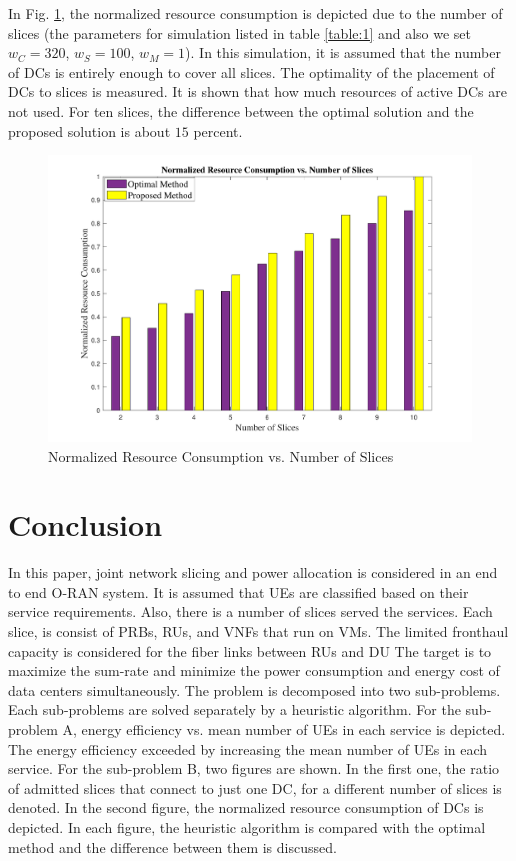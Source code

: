 \documentclass[conference]{IEEEtran}
\begin{document}
In Fig. \ref{fig:f2}, the normalized resource consumption is depicted due to the number of slices (the parameters for simulation listed in table \ref{table:1} and also we set $w_C = 320$, $w_S = 100$, $w_M =1$). In this simulation, it is assumed that the number of DCs is entirely enough to cover all slices. The optimality of the placement of DCs to slices is measured. It is shown that how much resources of active DCs are not used. For ten slices, the difference between the optimal solution and the proposed solution is about $15$ percent.
\begin{figure}%
  \centering
    \includegraphics[width=\linewidth]{fig22_last}
  \caption{Normalized Resource Consumption vs. Number of Slices}
  \label{fig:f2}
\end{figure}
\section{Conclusion}
In this paper, joint network slicing and power allocation is considered in an end to end O-RAN system.
It is assumed that UEs are classified based on their service requirements. Also, there is a number of slices served the services. Each slice, is consist of PRBs, RUs, and VNFs that run on VMs. The limited fronthaul capacity is considered for the fiber links between RUs and DU
The target is to maximize the sum-rate and minimize the power consumption and energy cost of data centers simultaneously.
The problem is decomposed into two sub-problems. Each sub-problems are solved separately by a heuristic algorithm. For the sub-problem A, energy efficiency vs. mean number of UEs in each service is depicted. The energy efficiency  exceeded by increasing the mean number of UEs in each service. For the sub-problem B, two figures are shown. In the first one, the ratio of admitted slices that connect to just one DC, for a different number of slices is denoted. In the second figure, the normalized resource consumption of DCs is depicted. In each figure, the heuristic algorithm is compared with the optimal method and the difference between them is discussed.




\end{document}
